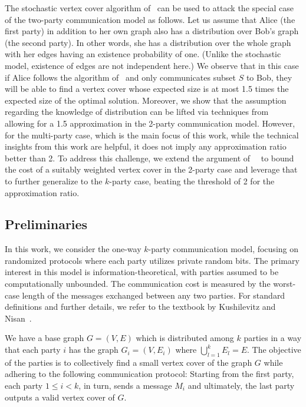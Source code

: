 \documentclass[11pt]{article}
\begin{document}
The stochastic vertex cover algorithm of~\cite{DBLP:conf/stoc/DerakhshanDH23} can be used to attack the special case of the two-party communication model as follows. Let us assume that Alice (the first party) in addition to her own graph also has a distribution over Bob's graph (the second party). In other words, she has a distribution over the whole graph with her edges having an existence probability of one. (Unlike the stochastic model, existence of edges are not independent here.) We observe that in this case if Alice follows the algorithm of~\cite{DBLP:conf/stoc/DerakhshanDH23} and only communicates subset $S$ to  Bob, they will be able to find a vertex cover whose expected size is at most 1.5 times the expected size of the optimal solution. Moreover, we show that the assumption regarding the knowledge of distribution can be lifted via techniques from~\cite{DBLP:conf/approx/AssadiB21} allowing for a 1.5 approximation in the 2-party communication model. However, for the multi-party case, which is the main focus of this work, while the technical insights from this work are helpful, it does not imply any approximation ratio better than 2.  To address this challenge, we extend the argument of~~\cite{DBLP:conf/stoc/DerakhshanDH23} to bound the cost of a suitably weighted vertex cover in the 2-party case and leverage that to further generalize to the $k$-party case, beating the threshold of 2 for the approximation ratio.








 



 \subsection{Preliminaries}
 In this work, we consider the one-way 
$k$-party communication model, focusing on randomized protocols where each party utilizes private random bits. The primary interest in this model is information-theoretical, with parties assumed to be computationally unbounded. The communication cost is measured by the worst-case length of the messages exchanged between any two parties. For standard definitions and further details, we refer to the textbook by Kushilevitz and Nisan~\cite{DBLP:books/daglib/0011756}.

We have a base graph $G = (V, E)$ which is distributed among $k$ parties in a way that each party $i$ has the graph $G_i = (V, E_i)$ where $\bigcup_{l= 1}^{k} E_l = E$. The objective of the parties is to collectively find a small vertex cover of the graph \( G \) while adhering to the following communication protocol: Starting from the first party, each party $1 \leq i < k$, in turn, sends a message $M_i$ and ultimately, the last party outputs a valid vertex cover of \( G \).
\end{document}
